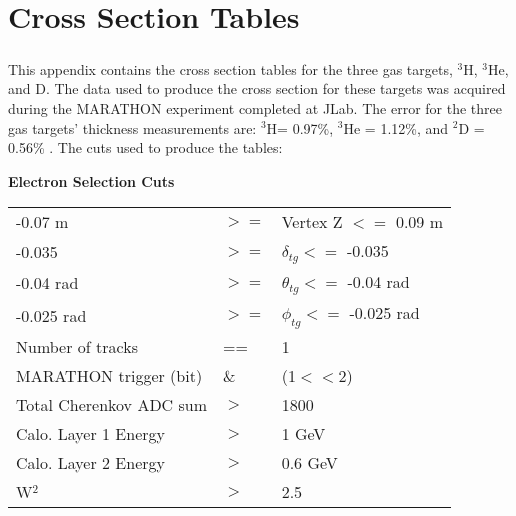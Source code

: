 \chapter{Cross Section Tables}\label{CST}
\paragraph{}This appendix contains the cross section tables for the three gas targets, $^3$H, $^3$He, and D. The data used to produce the cross section for these targets was acquired during the MARATHON experiment completed at JLab. The error for the three gas targets' thickness measurements are: $^3$H= 0.97\%, $^3$He = 1.12\%, and $^2$D = 0.56\% \cite{HATT_eng}.  The cuts used to produce the tables:

\textbf{Electron Selection Cuts}\\
\begin{tabular}{@{$\bullet$ }lll}
	-0.07 m &$>=$& Vertex Z $<=$ 0.09 m\\
	-0.035 &$ >=$ &$\delta_{tg} <=$ -0.035\\
	-0.04 rad &$>=$  &$\theta_{tg} <=$ -0.04 rad\\
	-0.025 rad &$>=$  &$\phi_{tg}   <=$ -0.025 rad\\
	Number of tracks & ==& 1\\
	MARATHON trigger (bit)  &\& &(1$<<$2)\\
	Total Cherenkov ADC sum &$>$ &1800\\
	Calo. Layer 1 Energy &$>$ & 1 GeV\\
	Calo. Layer 2 Energy &$>$ & 0.6 GeV\\
		W$^2$ &$>$ &2.5
\end{tabular}

